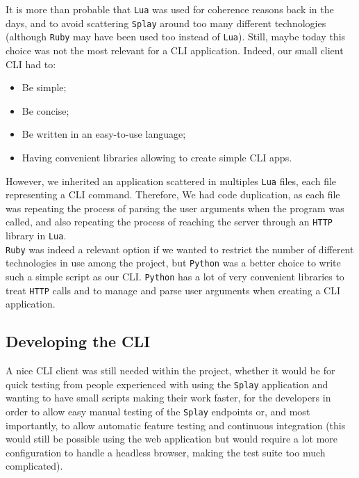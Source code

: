 \documentclass{eplmastersthesis}
\begin{document}
        It is more than probable that \texttt{Lua} was used for coherence reasons back
        in the days, and to avoid scattering \texttt{Splay} around too many different
        technologies (although \texttt{Ruby} may have been used too instead of \texttt{Lua}).
        Still, maybe today this choice was not the most relevant for a CLI
        application. Indeed, our small client CLI had to:

        \begin{itemize}
          \item Be simple;
          \item Be concise;
          \item Be written in an easy-to-use language;
          \item Having convenient libraries allowing to create simple CLI apps.
        \end{itemize}

        However, we inherited an application scattered in multiples \texttt{Lua}
        files, each file representing a CLI command. Therefore, We had code
        duplication, as each file was repeating the process of parsing the user
        arguments when the program was called, and also repeating the process
        of reaching the server through an \texttt{HTTP} library in \texttt{Lua}.\\
        \texttt{Ruby} was indeed a relevant option if we wanted to restrict the number
        of different technologies in use among the project, but \texttt{Python} was
        a better choice to write such a simple script as our CLI. \texttt{Python} has
        a lot of very convenient libraries to treat \texttt{HTTP} calls and to
        manage and parse user arguments when creating a CLI application.

      \subsection{Developing the CLI}

        A nice CLI client was still needed within the project, whether it
        would be for quick testing from people experienced with using the
        \texttt{Splay} application and wanting to have small scripts making their
        work faster, for the developers in order to allow easy manual testing
        of the \texttt{Splay} endpoints or, and most importantly, to allow automatic
        feature testing and continuous integration (this would still be
        possible using the web application but would require a lot more
        configuration to handle a headless browser, making the test suite
        too much complicated).\\
\end{document}
